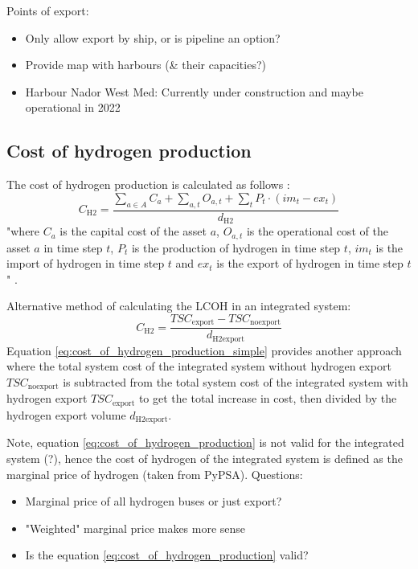 Points of export:
\begin{itemize}
    \item Only allow export by ship, or is pipeline an option?
    \item Provide map with harbours (\& their capacities?)
    \item Harbour Nador West Med: Currently under construction and maybe operational in 2022 \cite{Ersoy2022}
\end{itemize}


\subsection{Cost of hydrogen production}
\label{subsec:cost_of_hydrogen_production}

The cost of hydrogen production is calculated as follows \cite{Zeyen2022}:
\begin{equation}
    \label{eq:cost_of_hydrogen_production}
    C_\mathrm{H2}= \frac{\sum \limits_{a\in A}^{} C_a + \sum \limits_{a,t} O_{a,t} + \sum \limits_{t} P_t \cdot (im_t - ex_t)   }{d_\mathrm{H2}}
\end{equation}
"where $C_a$ is the capital cost of the asset $a$, $O_{a,t}$ is the operational cost of the asset $a$ in time step $t$, $P_t$ is the production of hydrogen in time step $t$, $im_t$ is the import of hydrogen in time step $t$ and $ex_t$ is the export of hydrogen in time step $t$" \cite{Zeyen2022}.


Alternative method of calculating the LCOH in an integrated system:
\begin{equation}
    \label{eq:cost_of_hydrogen_production_simple}
    C_\mathrm{H2}=\frac{TSC_\mathrm{export}-TSC_\mathrm{noexport}}{d_\mathrm{H2export}}
\end{equation}
Equation \ref{eq:cost_of_hydrogen_production_simple} provides another approach where the total system cost of the integrated system without hydrogen export $TSC_\mathrm{noexport}$ is subtracted from the total system cost of the integrated system with hydrogen export $TSC_\mathrm{export}$ to get the total increase in cost, then divided by the hydrogen export volume $d_\mathrm{H2export}$.

Note, equation \ref{eq:cost_of_hydrogen_production} is not valid for the integrated system (?),
hence the cost of hydrogen of the integrated system is defined as the marginal price of hydrogen (taken from PyPSA).
Questions:
\begin{itemize}
    \item Marginal price of all hydrogen buses or just export?
    \item "Weighted" marginal price makes more sense
    \item Is the equation \ref{eq:cost_of_hydrogen_production} valid?
\end{itemize}


